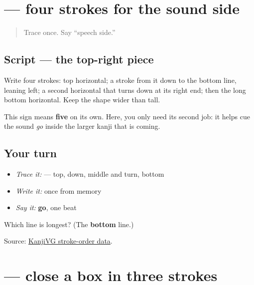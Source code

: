 \section[\texorpdfstring{\ja{五} (go)}{五 (go)}]{ — four strokes for the sound side}

\label{lesson:JA-W05-five-component}



\begin{quote}
Trace  once. Say “speech side.”
\end{quote}

\subsection*{Script — the top-right piece}

\begin{quote}
\end{quote}

Write four strokes: top horizontal; a stroke from it down to the bottom line, leaning left; a second horizontal that turns down at its right end; then the long bottom horizontal. Keep the shape wider than tall.

This sign means \textbf{five} on its own. Here, you only need its second job: it helps cue the sound \emph{go} inside the larger kanji that is coming.

\subsection*{Your turn}
\begin{itemize}
\raggedright
  \item \emph{Trace it:}  — top, down, middle and turn, bottom
  \item \emph{Write it:}  once from memory
  \item \emph{Say it:} \textbf{go}, one beat
\end{itemize}

\begin{tcolorbox}[breakable,colback=teal!4,colframe=teal!35!black,title={Before you move on}]
Which line is longest? (The \textbf{bottom} line.)

Source: \href{https://kanjivg.tagaini.net/kanjivg/kanji/04e94.html}{KanjiVG stroke-order data}.
\end{tcolorbox}
\section[\texorpdfstring{\ja{口} (kuchi)}{口 (kuchi)}]{ — close a box in three strokes}

